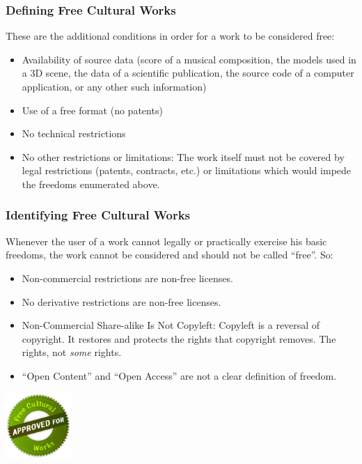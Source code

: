 \begin{frame}
\frametitle{Defining Free Cultural Works}

These are the additional conditions in order for a work to be considered free:

\begin{itemize}
\item \alert{Availability of source data} (score of a musical composition, the models used in a 3D scene, the data of a scientific publication, the source code of a computer application, or any other such information)
\item \alert{Use of a free format} (no patents)
\item \alert{No technical restrictions}
\item \alert{No other restrictions or limitations:} The work itself must not be covered by legal restrictions (patents, contracts, etc.) or limitations which would impede the freedoms enumerated above.
\end{itemize}                                                 

\end{frame}



\begin{frame}
\frametitle{Identifying Free Cultural Works}

Whenever the user of a work cannot legally or practically exercise his basic freedoms, the work cannot be considered and should not be called ``free''. So: 

\begin{itemize}
\item \alert{Non-commercial} restrictions are \alert{non-free} licenses.
\item \alert{No derivative} restrictions are \alert{non-free} licenses. 
\item \alert{Non-Commercial Share-alike} Is Not Copyleft: Copyleft is a reversal of copyright. It restores and protects the rights that copyright removes. \alert{The} rights, not \textit{some} rights.
\item ``Open Content'' and ``Open Access'' are \alert{not} a clear definition of freedom. 
\end{itemize}                                                 

\begin{center}
\includegraphics[width=2.5cm]{figs/seal.png}

\end{center}


\end{frame}


